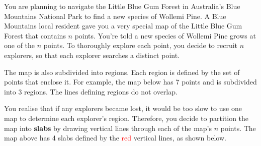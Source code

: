 \documentclass[12pt]{article}
\begin{document}
\begin{question}
You are planning to navigate the Little Blue Gum Forest in Australia’s Blue Mountains National Park to find a new species of Wollemi Pine. A Blue Mountains local resident gave you a very special map of the Little Blue Gum Forest that contains $n$ points. You're told a new species of Wollemi Pine grows at one of the $n$ points. To thoroughly explore each point, you decide to recruit $n$ explorers, so that each explorer searches a distinct point. 

The map is also subdivided into regions. Each region is defined by the set of points that enclose it. For example, the map below has 7 points and is subdivided into 3 regions. The lines defining regions do not overlap.

\begin{center}
\end{center}

You realise that if any explorers became lost, it would be too slow to use one map to determine each explorer's region. Therefore, you decide to partition the map into \textbf{slabs} by drawing vertical lines through each of the map's $n$ points. The map above has 4 slabs defined by the \textcolor{red}{red} vertical lines, as shown below.


\begin{center} 
\end{center}
\end{question}
\end{document}
